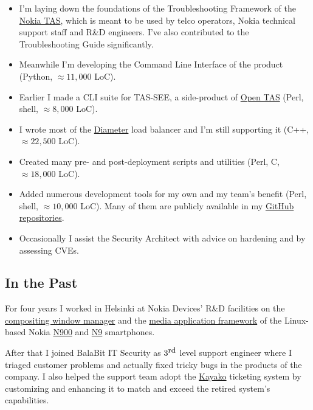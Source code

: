 \documentclass[a4paper,12pt]{article}
\newcommand{\compress}{\setlength\itemsep{-\parskip}}
\newenvironment{compressedItemize}{\begin{itemize}\compress}{\end{itemize}}
\begin{document}
\begin{compressedItemize}
\item	I'm laying down the foundations of the Troubleshooting Framework
	of the \hyperlink{TAS}{Nokia TAS}, which is meant to be used by
	telco operators, Nokia technical support staff and R\&D engineers.
	I've also contributed to the Troubleshooting Guide significantly.
\item	Meanwhile I'm developing the Command Line Interface of the product
	(Python, $\approx 11{,}000$ LoC).
\item	Earlier I made a CLI suite for TAS-SEE, a side-product of
	\hyperlink{TAS}{Open TAS} (Perl, shell, $\approx 8{,}000$ LoC).
\item	I wrote most of the \href{http://tools.ietf.org/html/rfc6733}{Diameter}
	load balancer and I'm still supporting it (C++, $\approx 22{,}500$ LoC).
\item	Created many pre- and post-deployment scripts and utilities (Perl, C,
	$\approx 18{,}000$ LoC).
\item	Added numerous development tools for my own and my team's benefit
	(Perl, shell, $\approx 10{,}000$ LoC).  Many of them are publicly
	available in my \href{http://github.com/enadam?tab=repositories}%
	{GitHub repositories}.
\item	Occasionally I assist the Security Architect with advice on hardening
	and by assessing CVEs.
\end{compressedItemize}

\subsection*{In the Past}

For four years I worked in Helsinki at \hypertarget{gadgets}{Nokia Devices'
R\&D facilities} on the
\href{http://wiki.maemo.org/Documentation/Maemo_5_Developer_Guide/Architecture/UI_Framework#hildon-desktop}{compositing window manager} and the
\href{http://wiki.maemo.org/Documentation/Maemo_5_Developer_Guide/Using_Multimedia_Components/Media_Application_Framework_(MAFW)}{media application framework}
of the Linux-based Nokia \href{http://maemo.org/intro/maemo_history}{N900}
and \href{http://en.wikipedia.org/wiki/Nokia_N9}{N9} smartphones.

\medskip
After that I joined BalaBit IT Security as $3^{\textrm{\small rd}}$ level
support engineer where I triaged customer problems and actually fixed
tricky bugs in the products of the company.  I also helped the support
team adopt the \href{http://www.kayako.com}{Kayako} ticketing system by
customizing and enhancing it to match and exceed the retired system's
capabilities.
\end{document}
